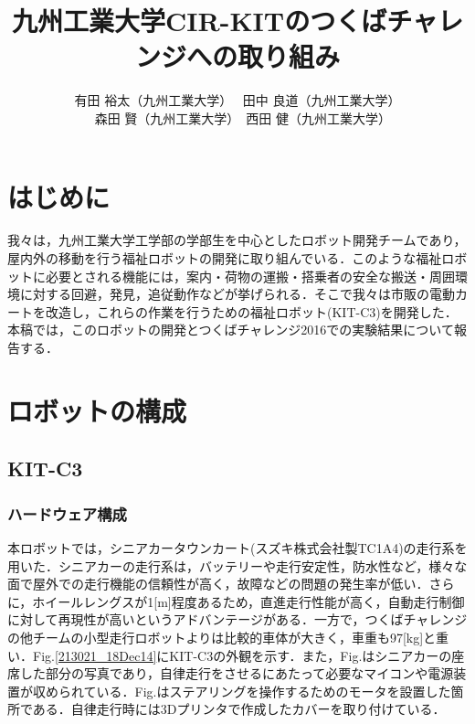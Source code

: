 \documentclass[10pt,a4paper]{jarticle}
\begin{document}
\title{\fontsize{16pt}{0pt}\selectfont 九州工業大学CIR-KITのつくばチャレンジへの取り組み}
\author{\fontsize{12pt}{0pt} 有田 裕太（九州工業大学）~ 田中 良道（九州工業大学） \\ ~ 森田 賢（九州工業大学）~西田 健（九州工業大学）}
\engtitle{
   \fontsize{16pt}{40pt}\selectfont 
}

\abstract{
\fontsize{9pt}{0pt}\selectfont
}

\maketitle\thispagestyle{empty}
\pagestyle{empty}

\section{はじめに}
\label{sec:intro}
我々は，九州工業大学工学部の学部生を中心としたロボット開発チームであり，屋内外の移動を行う福祉ロボットの開発に取り組んでいる．このような福祉ロボットに必要とされる機能には，案内・荷物の運搬・搭乗者の安全な搬送・周囲環境に対する回避，発見，追従動作などが挙げられる．そこで我々は市販の電動カートを改造し，これらの作業を行うための福祉ロボット(KIT-C3)を開発した．本稿では，このロボットの開発とつくばチャレンジ2016での実験結果について報告する．

\section{ロボットの構成}
\subsection{KIT-C3}
\subsubsection{ハードウェア構成}
本ロボットでは，シニアカータウンカート(スズキ株式会社製TC1A4)の走行系を用いた．シニアカーの走行系は，バッテリーや走行安定性，防水性など，様々な面で屋外での走行機能の信頼性が高く，故障などの問題の発生率が低い．さらに，ホイールレングスが1[m]程度あるため，直進走行性能が高く，自動走行制御に対して再現性が高いというアドバンテージがある．一方で，つくばチャレンジの他チームの小型走行ロボットよりは比較的車体が大きく，車重も97[kg]と重い．Fig.\ref{213021_18Dec14}にKIT-C3の外観を示す．また，Fig.はシニアカーの座席した部分の写真であり，自律走行をさせるにあたって必要なマイコンや電源装置が収められている．Fig.はステアリングを操作するためのモータを設置した箇所である．自律走行時には3Dプリンタで作成したカバーを取り付けている．
\end{document}
